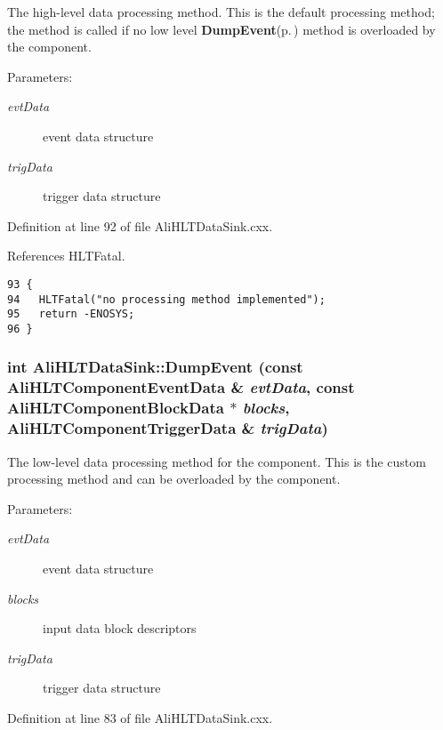 The high-level data processing method. This is the default processing method; the method is called if no low level {\bf Dump\-Event}{\rm (p.\,\pageref{classAliHLTDataSink_d0})} method is overloaded by the component. \begin{Desc}
\item[Parameters:]
\begin{description}
\item[{\em evt\-Data}]event data structure \item[{\em trig\-Data}]trigger data structure \end{description}
\end{Desc}


Definition at line 92 of file Ali\-HLTData\-Sink.cxx.

References HLTFatal.

\footnotesize\begin{verbatim}93 {
94   HLTFatal("no processing method implemented");
95   return -ENOSYS;
96 }
\end{verbatim}\normalsize 


\subsubsection{\setlength{\rightskip}{0pt plus 5cm}int Ali\-HLTData\-Sink::Dump\-Event (const {\bf Ali\-HLTComponent\-Event\-Data} \& {\em evt\-Data}, const {\bf Ali\-HLTComponent\-Block\-Data} $\ast$ {\em blocks}, {\bf Ali\-HLTComponent\-Trigger\-Data} \& {\em trig\-Data})\hspace{0.3cm}{\tt  [private, virtual]}}\label{classAliHLTDataSink_d0}


The low-level data processing method for the component. This is the custom processing method and can be overloaded by the component. \begin{Desc}
\item[Parameters:]
\begin{description}
\item[{\em evt\-Data}]event data structure \item[{\em blocks}]input data block descriptors \item[{\em trig\-Data}]trigger data structure \end{description}
\end{Desc}


Definition at line 83 of file Ali\-HLTData\-Sink.cxx.

